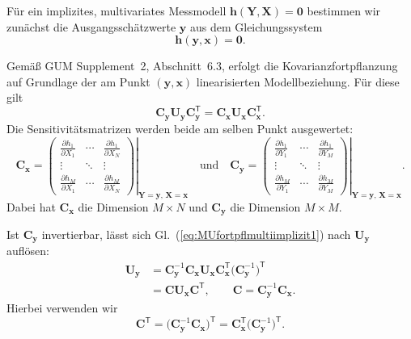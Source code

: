 Für ein implizites, multivariates Messmodell
$\mathbf h(\mathbf Y,\mathbf X)=\mathbf 0$
bestimmen wir zunächst die Ausgangsschätzwerte $\mathbf y$
aus dem Gleichungssystem
\begin{equation}
\mathbf h(\mathbf y,\mathbf x)=\mathbf 0.
\end{equation}

Gemäß GUM Supplement~2, Abschnitt~6.3, erfolgt die
Kovarianzfortpflanzung auf Grundlage der am Punkt
$(\mathbf y,\mathbf x)$ linearisierten Modellbeziehung.
Für diese gilt
\begin{equation}
\mathbf C_{\mathbf y}\mathbf U_{\mathbf y}
\mathbf C_{\mathbf y}^{\mathsf T}
=
\mathbf C_{\mathbf x}\mathbf U_{\mathbf x}
\mathbf C_{\mathbf x}^{\mathsf T}.
\label{eq:MUfortpflmultiimplizit1}
\end{equation}
Die Sensitivitätsmatrizen werden beide am selben Punkt
ausgewertet:
\begin{equation}
\mathbf C_{\mathbf x}
 =
\left.
\begin{pmatrix}
\frac{\partial h_1}{\partial X_1}
& \cdots & \frac{\partial h_1}{\partial X_N}\\
\vdots & \ddots & \vdots\\
\frac{\partial h_M}{\partial X_1}
& \cdots & \frac{\partial h_M}{\partial X_N}
\end{pmatrix}
\right|_{\mathbf Y=\mathbf y,\,\mathbf X=\mathbf x}
\quad \text{und} \quad
\mathbf C_{\mathbf y}
 =
\left.
\begin{pmatrix}
\frac{\partial h_1}{\partial Y_1}
& \cdots & \frac{\partial h_1}{\partial Y_M}\\
\vdots & \ddots & \vdots\\
\frac{\partial h_M}{\partial Y_1}
& \cdots & \frac{\partial h_M}{\partial Y_M}
\end{pmatrix}
\right|_{\mathbf Y=\mathbf y,\,\mathbf X=\mathbf x}.
\label{eq:sensitivitaetsmatrixh}
\end{equation}
Dabei hat $\mathbf C_{\mathbf x}$ die Dimension $M\times N$
und $\mathbf C_{\mathbf y}$ die Dimension $M\times M$.

Ist $\mathbf C_{\mathbf y}$ invertierbar, lässt sich
Gl.~(\ref{eq:MUfortpflmultiimplizit1}) nach
$\mathbf U_{\mathbf y}$ auflösen:
\begin{equation}
\begin{aligned}
\mathbf U_{\mathbf y}
&=
\mathbf C_{\mathbf y}^{-1}\mathbf C_{\mathbf x}
\mathbf U_{\mathbf x}
\mathbf C_{\mathbf x}^{\mathsf T}
\bigl(\mathbf C_{\mathbf y}^{-1}\bigr)^{\mathsf T}
\\
&=
\mathbf C\mathbf U_{\mathbf x}\mathbf C^{\mathsf T},
\qquad
\mathbf C=\mathbf C_{\mathbf y}^{-1}\mathbf C_{\mathbf x}.
\end{aligned}
\label{eq:MUfortpflmultiimplizit2}
\end{equation}
Hierbei verwenden wir
\begin{equation}
\mathbf C^{\mathsf T}
=
\bigl(\mathbf C_{\mathbf y}^{-1}\mathbf C_{\mathbf x}\bigr)^{\mathsf T}
=
\mathbf C_{\mathbf x}^{\mathsf T}
\bigl(\mathbf C_{\mathbf y}^{-1}\bigr)^{\mathsf T}.
\end{equation}

